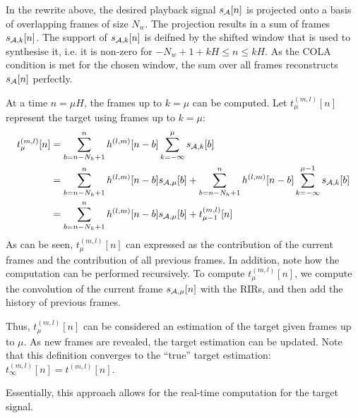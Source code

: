 In the rewrite above, the desired playback signal $s_{\mathcal{A}}[n]$ is projected onto a basis of overlapping frames of size $N_w$.
The projection results in a sum of frames $s_{\mathcal{A}, k}[n]$. 
The support of $s_{\mathcal{A}, k}[n]$ is deifned by the shifted window that is used to synthesise it, i.e. it is non-zero for $-N_w + 1 + kH \leq n \leq kH$.
As the COLA condition is met for the chosen window, the sum over all frames reconstructs $s_{\mathcal{A}}[n]$ perfectly.

At a time $n = \mu H$, the frames up to $k = \mu$ can be computed.
Let $t_\mu^{(m,l)}[n]$ represent the target using frames up to $k = \mu$:  
\begin{align}
    t_\mu^{(m,l)}[n] &= \sum_{b = n - N_h + 1}^{n} h^{(l,m)}[n - b] 
                        \sum_{k=-\infty}^{\mu} s_{\mathcal{A},k}[b] \\
                     &= \sum_{b = n - N_h + 1}^{n} h^{(l,m)}[n - b] 
                        s_{\mathcal{A},\mu}[b] + \sum_{b = n - N_h + 1}^{n} h^{(l,m)}[n - b] 
                        \sum_{k=-\infty}^{\mu - 1} s_{\mathcal{A}, k}[b] \\
                     &= \sum_{b = n - N_h + 1}^{n} h^{(l,m)}[n - b] 
                        s_{\mathcal{A}, \mu}[b] + t_{\mu - 1}^{(m,l)}[n]
\end{align}
As can be seen, $t_\mu^{(m,l)}[n]$ can expressed as the contribution of the current frames and the contribution of all previous frames.
In addition, note how the computation can be performed recursively.
To compute $t_\mu^{(m,l)}[n]$, we compute the convolution of the current frame $s_{\mathcal{A}, \mu}[n]$ with the RIRs, 
and then add the history of previous frames.

Thus, $t_\mu^{(m,l)}[n]$ can be considered an estimation of the target given frames up to $\mu$. 
As new frames are revealed, the target estimation can be updated.
Note that this definition converges to the ``true'' target estimation: $t_\infty^{(m,l)}[n] = t^{(m,l)}[n]$. 

Essentially, this approach allows for the real-time computation for the target signal.

